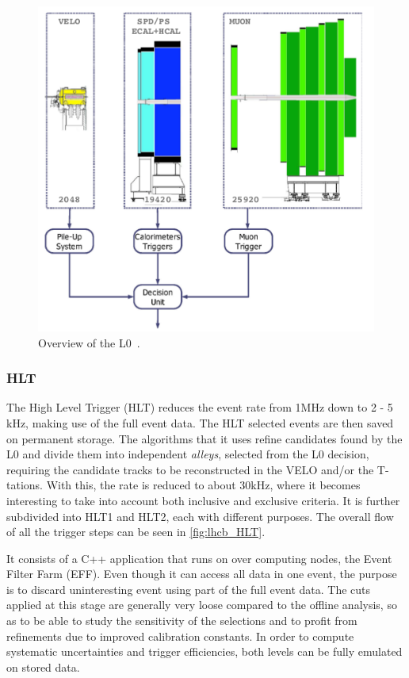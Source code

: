 \begin{figure} [htb!]
\begin{center}
\includegraphics[scale=0.7]{figs/L0.png}
\caption{Overview of the L0~\cite{Alves:2008zz}.\label{fig:lhcb_L0}}
\end{center}
\end{figure}



\subsubsection{HLT} 
The High Level Trigger (HLT) reduces the event rate from 1MHz down to 2 - 5 kHz, making use of the full event data. The HLT selected events are then saved on permanent storage. The algorithms that it uses refine candidates found by the L0 and divide them into independent \textit{alleys}, selected from the L0 decision, requiring the candidate tracks to be reconstructed in the VELO and/or the T-tations. With this, the rate is reduced to about 30kHz, where it becomes interesting to take into account both inclusive and exclusive criteria. It is further subdivided into HLT1 and HLT2, each with different purposes. The overall flow of all the trigger steps can be seen in \ref{fig:lhcb_HLT}. 

It consists of a C++ application that runs on over  computing nodes, the Event Filter Farm (EFF). Even though it can access all data in one event, the purpose is to discard uninteresting event using part of the full event data. The cuts applied at this stage are generally very loose compared to the offline analysis, so as to be able to study the sensitivity of the selections and to profit from refinements due to improved calibration constants. In order to compute systematic uncertainties and trigger efficiencies, both levels can be fully emulated on stored data. 

